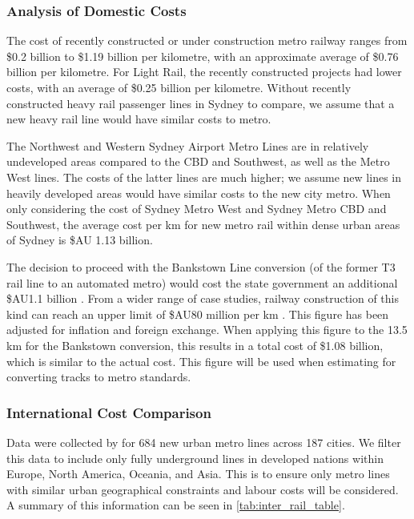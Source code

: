 \documentclass[preprint,12pt,authoryear]{elsarticle}
\begin{document}
\subsubsection{Analysis of Domestic Costs}

The cost of recently constructed or under construction metro railway ranges from \$0.2 billion to \$1.19 billion per kilometre, with an approximate average of \$0.76 billion per kilometre. For Light Rail, the recently constructed projects had lower costs, with an average of \$0.25 billion per kilometre. Without recently constructed heavy rail passenger lines in Sydney to compare, we assume that a new heavy rail line would have similar costs to metro. 

The Northwest and Western Sydney Airport Metro Lines are in relatively undeveloped areas compared to the CBD and Southwest, as well as the Metro West lines. The costs of the latter lines are much higher; we assume new lines in heavily developed areas would have similar costs to the new city metro. When only considering  the cost of Sydney Metro West and Sydney Metro CBD and Southwest, the average cost per km for new metro rail within dense urban areas of Sydney is \$AU 1.13 billion.

The decision to proceed with the Bankstown Line conversion (of the former T3 rail line to an automated metro) would cost the state government an additional \$AU1.1 billion \parencite{osullivan2023}. From a wider range of case studies, railway construction of this kind can reach an upper limit of \$AU80 million per km \parencite{flyvbjerg2008}. This figure has been adjusted for inflation and foreign exchange. When applying this figure to the 13.5 km for the Bankstown conversion, this results in a total cost of \$1.08 billion, which is similar to the actual cost. This figure will be used when estimating for converting tracks to metro standards. 



\subsubsection{International Cost Comparison}


Data were collected by \textcite{TransitCosts2024} for 684 new urban metro lines across 187 cities. We filter this data to include only fully underground lines in  developed nations within Europe, North America, Oceania, and Asia. This is to ensure only metro lines with similar urban geographical constraints and labour costs will be considered. A summary of this information can be seen in \cref{tab:inter_rail_table}.
\end{document}
